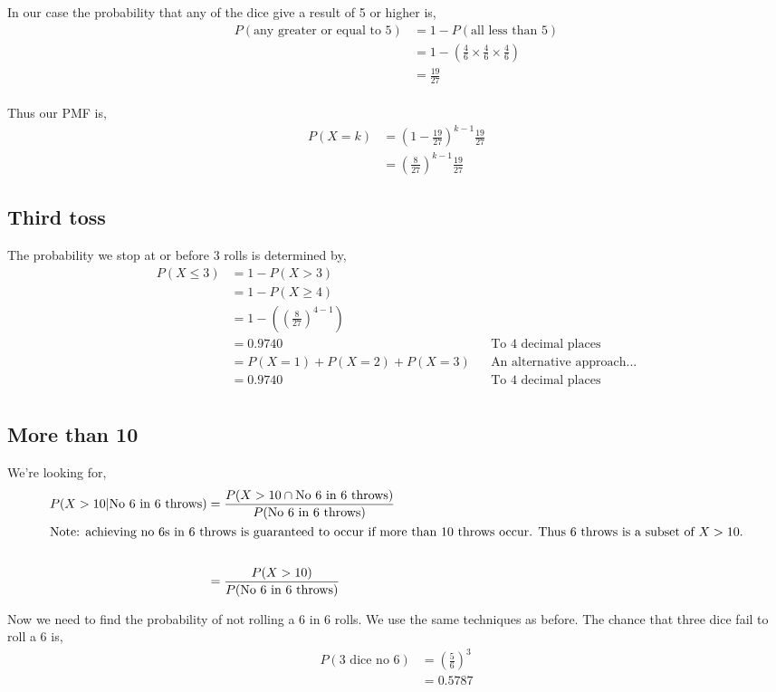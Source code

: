 \documentclass{article}
\begin{document}
In our case the probability that any of the dice give a result of 5 or higher
is,
\begin{align*}
    P(\text{any greater or equal to 5}) &= 1 - P(\text{all less than 5}) \\
    &= 1 - \left(\frac{4}{6}\times\frac{4}{6}\times\frac{4}{6}\right) \\
    &= \frac{19}{27} \\
\end{align*}

Thus our PMF is,
\begin{align*}
    P(X=k) &= \left(1-\frac{19}{27}\right)^{k-1}\frac{19}{27} \\
    &= \left(\frac{8}{27}\right)^{k-1}\frac{19}{27}
\end{align*}

\subsection{Third toss}
The probability we stop at or before 3 rolls is determined by,
\begin{align*}
    P(X \leq 3) &= 1 - P(X > 3) \\
    &= 1 - P(X \geq 4) \\
    &= 1 - \left(\left(\frac{8}{27}\right)^{4-1}\right) \\
    &= 0.9740 && \text{To 4 decimal places} \\
    &= P(X=1) + P(X=2) + P(X=3) && \text{An alternative approach...} \\
    &= 0.9740 && \text{To 4 decimal places} \\
\end{align*}

\subsection{More than 10}
We're looking for,
\begin{align*}
    P(X>10|\text{No 6 in 6 throws})
    &= \frac{P(X>10 \cap \text{No 6 in 6 throws})}
    {P(\text{No 6 in 6 throws})} \\
    \intertext{Note: achieving no 6s in 6 throws is guaranteed to occur
    if more than 10 throws occur. Thus 6 throws is a subset of $X>10$.} \\
    &= \frac{P(X>10)}{P(\text{No 6 in 6 throws})} \\
\end{align*}

Now we need to find the probability of not rolling a 6 in 6 rolls. We use the
same techniques as before. The chance that three dice fail to roll a 6 is,
\begin{align*}
    P(\text{3 dice no 6}) &= \left(\frac{5}{6}\right)^3 \\
    &= 0.5787 \\
\end{align*}
\end{document}
